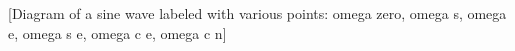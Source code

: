 [Diagram of a sine wave labeled with various points: omega zero, omega s, omega e, omega s e, omega c e, omega c n]